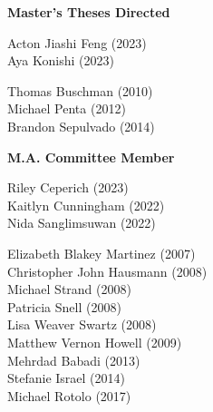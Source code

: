 
\noindent \textbf{Master's Theses Directed}

    \begin{multicols}{2}
    \noindent
    Acton Jiashi Feng (2023) \\
    Aya Konishi (2023)  \\ 	
\end{multicols}

    \begin{multicols}{2}
    \noindent
    Thomas Buschman (2010) \\
    Michael Penta (2012)  \\ 	
    Brandon Sepulvado (2014)
\end{multicols}
\newpage
\noindent \textbf{M.A. Committee Member}  

\begin{multicols}{2}
    \noindent
    Riley Ceperich (2023) \\
    Kaitlyn Cunningham (2022) \\
    Nida Sanglimsuwan (2022) 
\end{multicols}

\medskip
{}
\begin{multicols}{2}
    \noindent
    Elizabeth Blakey Martinez (2007) \\
    Christopher John Hausmann (2008) \\
    Michael Strand (2008) \\
    Patricia Snell (2008) \\
    Lisa Weaver Swartz (2008) \\
    Matthew Vernon Howell (2009) \\
    Mehrdad Babadi (2013) \\
    Stefanie Israel (2014) \\
    Michael Rotolo (2017)
\end{multicols}